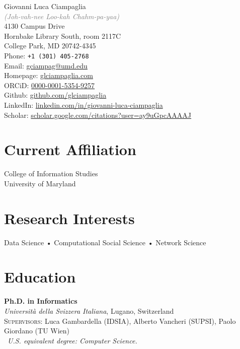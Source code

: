 \documentclass[10pt, letterpaper]{article}
\newcommand{\years}[1]{\marginnote{\small #1}}
\begin{document}
{\LARGE Giovanni Luca Ciampaglia}\\\textcolor{gray}{\emph{(Joh-vah-nee Loo-kah Chahm-pa-yaa)}}\\[.75cm]
4130 Campus Drive\\
Hornbake Library South, room 2117C\\
College Park, MD 20742-4345\\
Phone: \texttt{+1 (301)\,405-2768}\\[.2cm]
Email: \href{mailto:gciampag3@umd.edu}{gciampag@umd.edu}\\
Homepage: \href{http://www.glciampaglia.com/}{glciampaglia.com}\\[.2cm]
ORCiD: \href{https://orcid.org/0000-0001-5354-9257}{0000-0001-5354-9257}\\
Github: \href{http://github.com/glciampaglia}{github.com/glciampaglia}\\ 
LinkedIn: \href{http://linkedin.com/in/giovanni-luca-ciampaglia}{linkedin.com/in/giovanni-luca-ciampaglia}\\
Scholar: \href{https://scholar.google.com/citations?user=ay9uGpcAAAAJ}{scholar.google.com/citations?user=ay9uGpcAAAAJ}\\

\section*{Current Affiliation}

College of Information Studies\\
University of Maryland

\section*{Research Interests}
Data Science • Computational Social Science • Network Science


\section*{Education}
\noindent

\years{2012}\textbf{Ph.D. in Informatics\textsuperscript{\textasteriskcentered}}\\
%
\textsl{Università della Svizzera Italiana}, Lugano, Switzerland\\
%
\textsc{Supervisors}: Luca Gambardella (IDSIA), Alberto Vancheri (SUPSI), Paolo
Giordano (TU Wien)\\
\textasteriskcentered~\emph{\footnotesize U.S. equivalent degree: Computer Science.}\\
\end{document}
